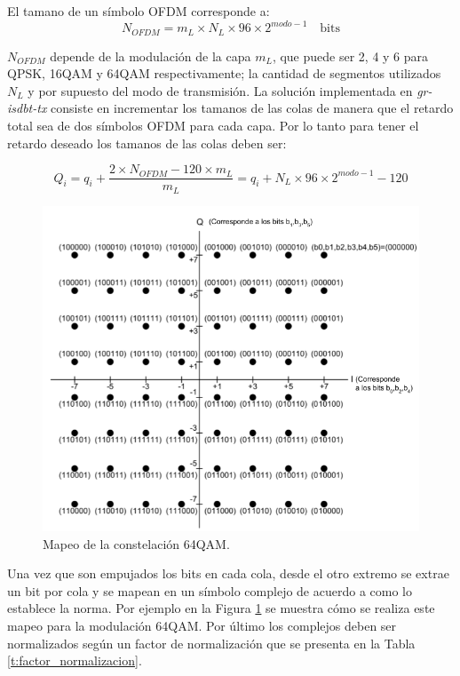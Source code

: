 El tamano de un s\'imbolo OFDM corresponde a: 
\begin{equation}
N_{OFDM} = m_L \times N_L \times 96 \times 2^{modo-1} \quad \text{bits}
\end{equation}

$N_{OFDM}$ depende de la modulaci\'on de la capa $m_L$, que puede ser 2, 4 y 6 para QPSK, 16QAM y 64QAM respectivamente; la cantidad de segmentos utilizados $N_L$ y por supuesto del modo de transmisi\'on. La soluci\'on implementada en \textit{gr-isdbt-tx} consiste en incrementar los tamanos de las colas de manera que el retardo total sea de dos s\'imbolos OFDM para cada capa. Por lo tanto para tener el retardo deseado los tamanos de las colas deben ser:

\begin{equation}
Q_i = q_i + \dfrac{2 \times N_{OFDM} - 120 \times m_L}{m_L} = q_i + N_L \times 96 \times 2^{modo-1} - 120
\end{equation}

\begin{figure}[!h]
\centering
\includegraphics[scale=0.5]{figuras/cap05/constelacion_64QAM}
\caption{\label{f:mapeo_64QAM} Mapeo de la constelaci\'on 64QAM.}
\end{figure}

Una vez que son empujados los bits en cada cola, desde el otro extremo se extrae un bit por cola y se mapean en un s\'imbolo complejo de acuerdo a como lo establece la norma. Por ejemplo en la Figura \ref{f:mapeo_64QAM} se muestra c\'omo se realiza este mapeo para la modulaci\'on 64QAM. Por \'ultimo los complejos deben ser normalizados seg\'un un factor de normalizaci\'on que se presenta en la Tabla \ref{t:factor_normalizacion}.

